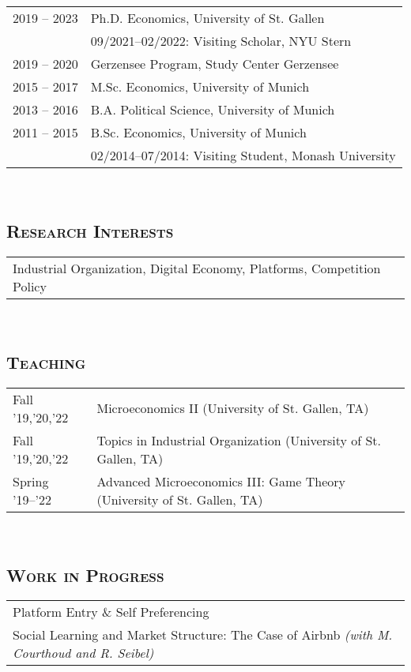 \documentclass[12pt]{article}
\begin{document}
\begin{tabular}{p{}p{}}
	2019 -- 2023 & Ph.D. Economics, University of St. Gallen \\
	& \hspace{5mm} 09/2021--02/2022: Visiting Scholar, NYU Stern\\[8pt]
2019 -- 2020	& Gerzensee Program, Study Center Gerzensee\\[8pt]
2015 -- 2017& M.Sc. Economics, University of Munich\\[8pt]
2013 -- 2016& B.A. Political Science, University of Munich\\[8pt]
2011 -- 2015&B.Sc. Economics, University of Munich\\
& \hspace{5mm} 02/2014--07/2014: Visiting Student, Monash University
\end{tabular}\\
\vspace{-0.45cm}\subsection*{\textsc{Research Interests}}
\begin{tabular}{l}
	Industrial Organization, Digital Economy, Platforms, Competition Policy
\end{tabular}\\
\vspace{-0.45cm}\subsection*{\textsc{Teaching}}
\begin{tabular}{p{}p{}}
	Fall '19,'20,'22 & Microeconomics II (University of St. Gallen, TA)\\
	Fall '19,'20,'22 & Topics in Industrial Organization (University of St. Gallen, TA)\\
	Spring '19--'22 & Advanced Microeconomics III: Game Theory (University of St. Gallen, TA)
\end{tabular}\\
\vspace{-0.45cm}\subsection*{\textsc{Work in Progress}}
\begin{tabular}{p{}}
	Platform Entry \& Self Preferencing \\
	Social Learning and Market Structure: The Case of Airbnb \textit{(with M. Courthoud and R. Seibel)}
\end{tabular}\\
\end{document}
